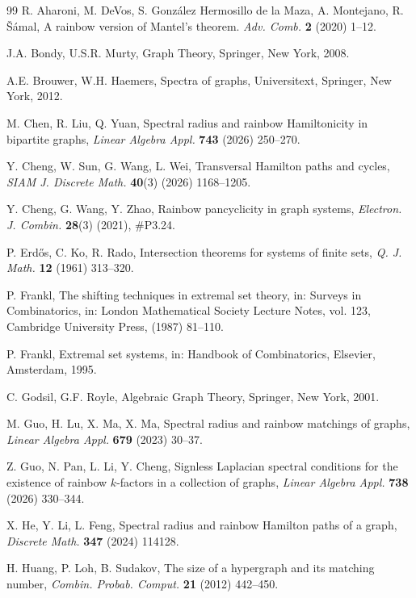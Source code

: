 \documentclass[11pt,a4paper]{article}
\theoremstyle{definition}
\numberwithin{equation}{section}
\begin{document}
\begin{thebibliography}{99}
R. Aharoni, M. DeVos, S. Gonz\'alez Hermosillo de la Maza, A. Montejano, R. \v{S}\'amal, A rainbow version of Mantel's theorem. \emph{Adv. Comb.} \textbf{2} (2020) 1--12.

J.A. Bondy, U.S.R. Murty, Graph Theory, Springer, New York, 2008.

A.E. Brouwer, W.H. Haemers, Spectra of graphs, Universitext, Springer, New York, 2012.

M. Chen, R. Liu, Q. Yuan, Spectral radius and rainbow Hamiltonicity in bipartite graphs, \emph{Linear Algebra Appl.} \textbf{743} (2026) 250--270.

Y. Cheng, W. Sun, G. Wang, L. Wei, Transversal Hamilton paths and cycles, \emph{SIAM J. Discrete Math.} \textbf{40}(3) (2026) 1168--1205.

Y. Cheng, G. Wang, Y. Zhao, Rainbow pancyclicity in graph systems, \emph{Electron. J. Combin.} \textbf{28}(3) (2021), \#P3.24.

P. Erd\H{o}s, C. Ko, R. Rado, Intersection theorems for systems of finite sets, \emph{Q. J. Math.} \textbf{12} (1961) 313--320.

P. Frankl, The shifting techniques in extremal set theory, in: Surveys in Combinatorics, in: London Mathematical Society Lecture Notes, vol. 123, Cambridge University Press, (1987) 81--110.

P. Frankl, Extremal set systems, in: Handbook of Combinatorics, Elsevier, Amsterdam, 1995.

C. Godsil, G.F. Royle, Algebraic Graph Theory, Springer, New York, 2001.

M. Guo, H. Lu, X. Ma, X. Ma, Spectral radius and rainbow matchings of graphs, \emph{Linear Algebra Appl.} \textbf{679} (2023) 30--37.

Z. Guo, N. Pan, L. Li, Y. Cheng, Signless Laplacian spectral conditions for the existence of rainbow $k$-factors in a collection of graphs, \emph{Linear Algebra Appl.} \textbf{738} (2026) 330--344.

X. He, Y. Li, L. Feng, Spectral radius and rainbow Hamilton paths of a graph, \emph{Discrete Math.} \textbf{347} (2024) 114128.

H. Huang, P. Loh, B. Sudakov, The size of a hypergraph and its matching number, \emph{Combin. Probab. Comput.} \textbf{21} (2012) 442--450.


\end{thebibliography}
\end{document}
